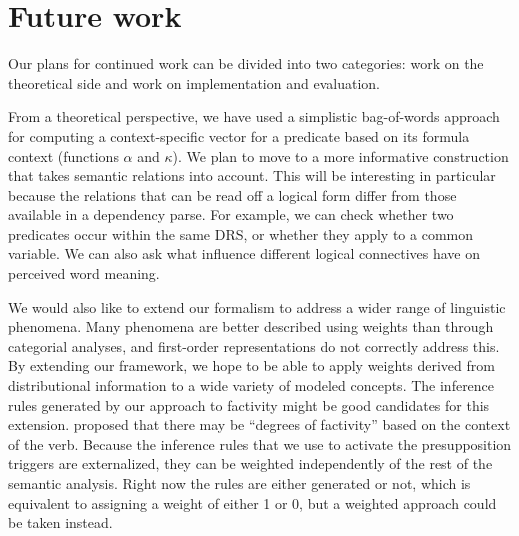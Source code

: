 \section{Future work}
\label{sec:future}

Our plans for continued work can be divided into two categories: work on the
theoretical side and work on implementation and evaluation.

From a theoretical perspective, we have used a simplistic bag-of-words
approach for
computing a context-specific vector for a predicate based on its
formula context (functions $\alpha$ and $\kappa$). We plan to move to a more informative construction
that takes semantic relations into account. This will be interesting in particular because the relations that can be read off a logical
form differ from those available in a dependency parse. For example,
we can check whether two predicates occur within the same DRS, or
whether they apply to a common variable. We can also ask what 
influence different logical connectives have on perceived word meaning. 

We would also like to extend our formalism to address a wider range of
linguistic phenomena.  Many phenomena are better described using weights than
through categorial analyses, and first-order representations do not correctly
address this.  By extending our framework, we hope to be able to apply weights
derived from distributional information to a wide variety of modeled concepts.
The inference rules generated by our approach to factivity might be good
candidates for this extension.  \citet{nairn:icos2006} proposed that there may  
be ``degrees of factivity'' based on the context of the verb.
Because the inference rules that we use to
activate the presupposition triggers are externalized, they can be weighted
independently of the rest of the semantic analysis.  Right now the rules are
either generated or not, which is equivalent to assigning a weight of either 1
or 0, but a weighted approach could be taken instead.

%

